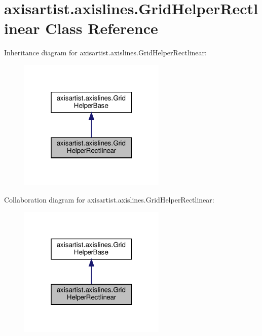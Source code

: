 \hypertarget{classaxisartist_1_1axislines_1_1GridHelperRectlinear}{}\section{axisartist.\+axislines.\+Grid\+Helper\+Rectlinear Class Reference}
\label{classaxisartist_1_1axislines_1_1GridHelperRectlinear}


Inheritance diagram for axisartist.\+axislines.\+Grid\+Helper\+Rectlinear\+:
\nopagebreak
\begin{figure}[H]
\begin{center}
\leavevmode
\includegraphics[width=199pt]{classaxisartist_1_1axislines_1_1GridHelperRectlinear__inherit__graph}
\end{center}
\end{figure}


Collaboration diagram for axisartist.\+axislines.\+Grid\+Helper\+Rectlinear\+:
\nopagebreak
\begin{figure}[H]
\begin{center}
\leavevmode
\includegraphics[width=199pt]{classaxisartist_1_1axislines_1_1GridHelperRectlinear__coll__graph}
\end{center}
\end{figure}
